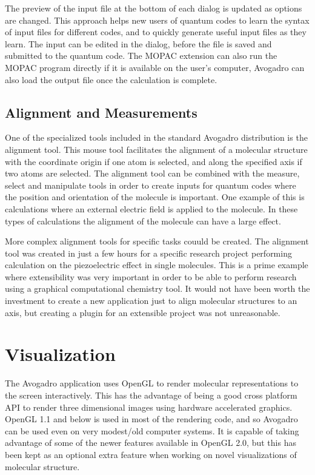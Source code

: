 \documentclass{article}
\begin{document}
The preview of the input file at the bottom of each dialog is updated as options are changed. This approach helps new users of quantum codes to learn the syntax of input files for different codes, and to quickly generate useful input files as they learn. The input can be edited in the dialog, before the file is saved and submitted to the quantum code. The MOPAC extension can also run the  MOPAC program directly if it is available on the user's computer, Avogadro can also load the output file once the calculation is complete.

\subsection{Alignment and Measurements}

One of the specialized tools included in the standard Avogadro distribution is the alignment tool. This mouse tool facilitates the alignment of a molecular structure with the coordinate origin if one atom is selected, and along the specified axis if two atoms are selected. The alignment tool can be combined with the measure, select and manipulate tools in order to create inputs for quantum codes where the position and orientation of the molecule is important. One example of this is calculations where an external electric field is applied to the molecule. In these types of calculations the alignment of the molecule can have a large effect.

More complex alignment tools for specific tasks couuld be created. The alignment tool was created in just a few hours for a specific research project performing calculation on the piezoelectric effect in single molecules. This is a prime example where extensibility was very important in order to be able to perform research using a graphical computational chemistry tool. It would not have been worth the investment to create a new application just to align molecular structures to an axis, but creating a plugin for an extensible project was not unreasonable.


\section{Visualization}

The Avogadro application uses OpenGL to render molecular representations to the screen interactively. This has the advantage of being a good cross platform API to render three dimensional images using hardware accelerated graphics. OpenGL 1.1 and below is used in most of the rendering code, and so Avogadro can be used even on very modest/old computer systems. It is capable of taking advantage of some of the newer features available in OpenGL 2.0, but this has been kept as an optional extra feature when working on novel visualizations of molecular structure.
\end{document}
